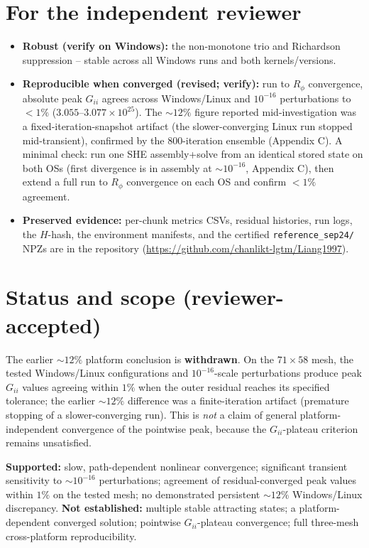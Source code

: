\documentclass[11pt]{article}
\newcommand{\ten}[1]{\times 10^{#1}}
\begin{document}
\section{For the independent reviewer}
\begin{itemize}[nosep]
\item \textbf{Robust (verify on Windows):} the non-monotone trio and Richardson suppression -- stable across all Windows runs and both kernels/versions.
\item \textbf{Reproducible when converged (revised; verify):} run to $R_\phi$ convergence, absolute peak $G_{ii}$ agrees across Windows/Linux and $10^{-16}$ perturbations to $<1\%$ ($3.055$--$3.077\ten{25}$). The $\sim12\%$ figure reported mid-investigation was a fixed-iteration-snapshot artifact (the slower-converging Linux run stopped mid-transient), confirmed by the 800-iteration ensemble (Appendix C). A minimal check: run one SHE assembly+solve from an identical stored state on both OSs (first divergence is in assembly at $\sim10^{-16}$, Appendix C), then extend a full run to $R_\phi$ convergence on each OS and confirm $<1\%$ agreement.
\item \textbf{Preserved evidence:} per-chunk metrics CSVs, residual histories, run logs, the $H$-hash, the environment manifests, and the certified \texttt{reference\_sep24/} NPZs are in the repository (\url{https://github.com/chanlikt-lgtm/Liang1997}).
\end{itemize}

\section{Status and scope (reviewer-accepted)}
The earlier $\sim12\%$ platform conclusion is \textbf{withdrawn}. On the $71\times58$ mesh, the tested Windows/Linux configurations and $10^{-16}$-scale perturbations produce peak $G_{ii}$ values agreeing within $1\%$ when the outer residual reaches its specified tolerance; the earlier $\sim12\%$ difference was a finite-iteration artifact (premature stopping of a slower-converging run). This is \emph{not} a claim of general platform-independent convergence of the pointwise peak, because the $G_{ii}$-plateau criterion remains unsatisfied.

\textbf{Supported:} slow, path-dependent nonlinear convergence; significant transient sensitivity to $\sim10^{-16}$ perturbations; agreement of residual-converged peak values within $1\%$ on the tested mesh; no demonstrated persistent $\sim12\%$ Windows/Linux discrepancy. \textbf{Not established:} multiple stable attracting states; a platform-dependent converged solution; pointwise $G_{ii}$-plateau convergence; full three-mesh cross-platform reproducibility.
\end{document}
